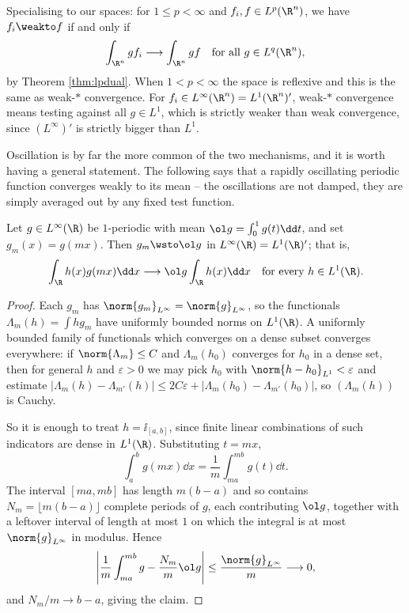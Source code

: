 \begin{example}
	Specialising to our spaces: for $1 \le p < \infty$ and $f_i, f \in L^p(\R^n)$, we have $f_i \weakto f$ if and only if
	$$\int_{\R^n} g f_i \longrightarrow \int_{\R^n} gf \quad \text{for all } g \in L^q(\R^n),$$
	by Theorem \ref{thm:lpdual}. When $1 < p < \infty$ the space is reflexive and this is the same as weak-$*$ convergence. For $f_i \in L^\infty(\R^n) = L^1(\R^n)'$, weak-$*$ convergence means testing against all $g \in L^1$, which is strictly weaker than weak convergence, since $(L^\infty)'$ is strictly bigger than $L^1$.
\end{example}

Oscillation is by far the more common of the two mechanisms, and it is worth having a general statement. The following says that a rapidly oscillating periodic function converges weakly to its mean -- the oscillations are not damped, they are simply averaged out by any fixed test function.

\begin{proposition}\label{prop:oscillation}
	Let $g \in L^\infty(\R)$ be $1$-periodic with mean $\ol g = \int_0^1 g(t)\dd t$, and set $g_m(x) = g(mx)$. Then $g_m \wsto \ol g$ in $L^\infty(\R) = L^1(\R)'$; that is,
	$$\int_\R h(x)g(mx)\dd x \longrightarrow \ol g \int_\R h(x) \dd x \quad \text{for every } h \in L^1(\R).$$
\end{proposition}

\begin{proof}
	Each $g_m$ has $\norm{g_m}_{L^\infty}=\norm{g}_{L^\infty}$, so the functionals $\Lambda_m(h)=\int hg_m$ have uniformly bounded norms on $L^1(\R)$. A uniformly bounded family of functionals which converges on a dense subset converges everywhere: if $\norm{\Lambda_m}\le C$ and $\Lambda_m(h_0)$ converges for $h_0$ in a dense set, then for general $h$ and $\varepsilon>0$ we may pick $h_0$ with $\norm{h-h_0}_{L^1}<\varepsilon$ and estimate $|\Lambda_m(h)-\Lambda_{m'}(h)|\le 2C\varepsilon+|\Lambda_m(h_0)-\Lambda_{m'}(h_0)|$, so $(\Lambda_m(h))$ is Cauchy.

	So it is enough to treat $h = \ii_{[a,b]}$, since finite linear combinations of such indicators are dense in $L^1(\R)$. Substituting $t = mx$,
	$$\int_a^b g(mx)\dd x = \frac 1m \int_{ma}^{mb}g(t)\dd t.$$
	The interval $[ma,mb]$ has length $m(b-a)$ and so contains $N_m = \lfloor m(b-a)\rfloor$ complete periods of $g$, each contributing $\ol g$, together with a leftover interval of length at most $1$ on which the integral is at most $\norm{g}_{L^\infty}$ in modulus. Hence
	$$\left| \frac 1m\int_{ma}^{mb}g - \frac{N_m}{m}\ol g\right| \le \frac{\norm{g}_{L^\infty}}{m} \longrightarrow 0,$$
	and $N_m/m \to b-a$, giving the claim.
\end{proof}


